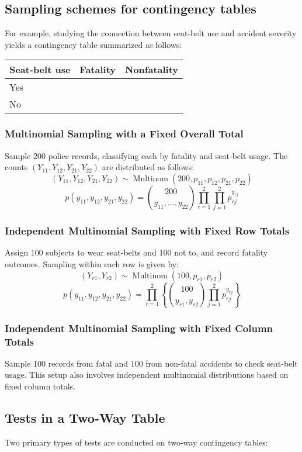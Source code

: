 \documentclass{article}
\begin{document}
\subsection{Sampling schemes for contingency tables}
For example, studying the connection between seat-belt use and accident severity yields a contingency table summarized as follows:
\begin{center}
\begin{tabular}{lll}
Seat-belt use & Fatality & Nonfatality \\
\hline
Yes &  &  \\
No &  &  \\
\hline
\end{tabular}
\end{center}

\subsubsection{Multinomial Sampling with a Fixed Overall Total}
Sample 200 police records, classifying each by fatality and seat-belt usage. The counts $(Y_{11}, Y_{12}, Y_{21}, Y_{22})$ are distributed as follows:
\[
(Y_{11}, Y_{12}, Y_{21}, Y_{22}) \sim \operatorname{Multinom}(200, p_{11}, p_{12}, p_{21}, p_{22})
\]
\[
p(y_{11}, y_{12}, y_{21}, y_{22})=\binom{200}{y_{11}, \ldots, y_{22}} \prod_{r=1}^{2} \prod_{j=1}^{2} p_{r j}^{y_{r j}}
\]

\subsubsection{Independent Multinomial Sampling with Fixed Row Totals}
Assign 100 subjects to wear seat-belts and 100 not to, and record fatality outcomes. Sampling within each row is given by:
\[
(Y_{r 1}, Y_{r 2}) \sim \operatorname{Multinom}(100, p_{r 1}, p_{r 2})
\]
\[
p(y_{11}, y_{12}, y_{21}, y_{22})=\prod_{r=1}^{2}\left\{\binom{100}{y_{r 1}, y_{r 2}} \prod_{j=1}^{2} p_{r j}^{y_{r j}}\right\}
\]

\subsubsection{Independent Multinomial Sampling with Fixed Column Totals}
Sample 100 records from fatal and 100 from non-fatal accidents to check seat-belt usage. This setup also involves independent multinomial distributions based on fixed column totals.

\subsection{Tests in a Two-Way Table}
Two primary types of tests are conducted on two-way contingency tables:
\end{document}
